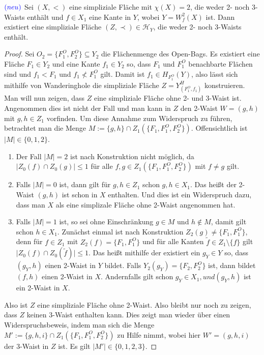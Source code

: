 \documentclass[12pt,titlepage]{article}
\begin{document}
\begin{satz}$\textcolor{blue}{(neu)}$
Sei $(X,<)$ eine simpliziale Fläche mit $\chi(X)=2$, die weder 2- noch 3-Waists enthält und $f\in X_1$ eine Kante in $Y$, wobei $Y=W^2_f(X)$ ist. Dann existiert eine simpliziale Fläche $(Z,\prec)\in \mathcal{H}_{Y}$, die weder 2- noch 3-Waists enthält.
\end{satz}
\begin{proof}
Sei $O_2=\{F_1^O,F_2^O\} \subseteq Y_2$ die Flächenmenge des Open-Bags. Es existiert eine Fläche $F_1 \in Y_2$ und eine Kante $f_1 \in Y_2$ so, dass $F_1$ und $F_1^O$ benachbarte Flächen sind und $f_1<F_1$ und $f_1 \nless F_1^O$ gilt. Damit ist $f_1 \in H_{F_1^O}(Y)$, also lässt sich mithilfe von Wanderinghole die simpliziale Fläche $Z=Y^H_{(F_1^O,f_1)}$ konstruieren. Man will nun zeigen, dass $Z$ eine simpliziale Fläche ohne 2- und 3-Waist ist. Angenommen dies ist nicht der Fall und man kann in $Z$ den 2-Waist $W=(g,h)$ mit $g,h\in Z_1$ vorfinden. Um diese Annahme zum Widerspruch zu führen, betrachtet man die Menge $M:=\{g,h\} \cap Z_1(\{F_1,F_1^O,F_2^O\})$. Offensichtlich ist $\vert M \vert \in\{0,1,2\}$.
\begin{enumerate}
\item  Der Fall $\vert M \vert=2$ ist nach Konstruktion nicht möglich, da $\vert Z_0(f) \cap Z_0(g)\vert \leq 1$ für alle $f,g \in Z_1(\{F_1,F_1^O,F_2^O\})$ mit $f \neq g$ gilt. 
\item Falls $\vert M \vert=0$ ist, dann gilt für $g,h \in Z_1$ schon $g,h \in X_1$. Das heißt der 2-Waist $(g,h)$ ist schon in $X$ enthalten. Und dies ist ein Widerspruch dazu, dass man $X$ als eine simplizale Fläche ohne 2-Waist angenommen hat.
\item 
 Falls $\vert M \vert=1$ ist, so sei ohne Einschränkung $g \in M$ und $h \notin M$, damit gilt schon $h \in X_1$. Zunächst einmal ist nach Konstruktion $Z_2(g)\neq \{F_1,F_1^O\}$, denn für $f\in Z_1$ mit $Z_2(f)=\{F_1,F_1^O\}$ und für alle Kanten $\tilde{f} \in Z_1\setminus \{f\}$ gilt $\vert Z_0(f) \cap Z_0(\tilde{f})\vert \leq 1. $ Das heißt mithilfe der  existiert ein $g_Y \in Y$ so, dass $(g_Y,h)$ einen 2-Waist in $Y$ bildet. Falls $Y_2(g_Y)=\{F_2,F_2^O\}$ ist, dann bildet $(f,h)$ einen 2-Waist in $X$. Andernfalls gilt schon $g_Y \in X_1, und (g_Y,h)$ ist ein 2-Waist in $X$.
\end{enumerate}
Also ist $Z$ eine simpliziale Fläche ohne 2-Waist. Also bleibt nur noch zu zeigen, dass $Z$ keinen 3-Waist enthalten kann. Dies zeigt man wieder über einen Widerspruchsbeweis, indem man sich die Menge $M':=\{g,h,i\} \cap Z_1(\{F_1,F_1^O,F_2^O\})$ zu Hilfe nimmt, wobei hier $W'=(g,h,i)$ der 3-Waist in $Z$ ist. Es gilt $\vert M' \vert \in \{0,1,2,3\}$.

\end{proof}
\end{document}
